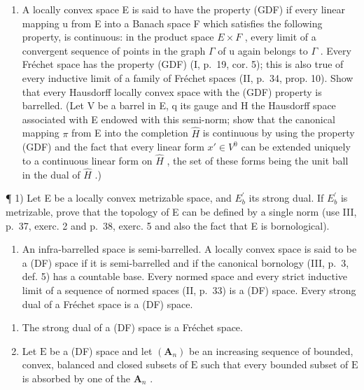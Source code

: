 \begin{enumerate}
\def\labelenumi{\arabic{enumi})}
\setcounter{enumi}{25}
\tightlist
\item
  A locally convex space E is said to have the property (GDF) if every linear mapping u from E into a Banach space F which satisfies the following property, is continuous: in the product space \(E \times F\) , every limit of a convergent sequence of points in the graph \(\Gamma\) of u again belongs to \(\Gamma\) . Every Fréchet space has the property (GDF) (I, p.~19, cor. 5); this is also true of every inductive limit of a family of Fréchet spaces (II, p.~34, prop. 10). Show that every Hausdorff locally convex space with the (GDF) property is barrelled. (Let V be a barrel in E, q its gauge and H the Hausdorff space associated with E endowed with this semi-norm; show that the canonical mapping \(\pi\) from E into the completion \(\hat{H}\) is continuous by using the property (GDF) and the fact that every linear form \(x' \in V^{0}\) can be extended uniquely to a continuous linear form on \(\hat{H}\) , the set of these forms being the unit ball in the dual of \(\hat{H}\) .)
\end{enumerate}

\exercisegroup

¶ 1) Let E be a locally convex metrizable space, and \(E_{b}^{\prime}\) its strong dual. If \(E_{b}^{\prime}\) is metrizable, prove that the topology of E can be defined by a single norm (use III, p.~37, exerc. 2 and p.~38, exerc. 5 and also the fact that E is bornological).

\begin{enumerate}
\def\labelenumi{\arabic{enumi})}
\setcounter{enumi}{1}
\tightlist
\item
  An infra-barrelled space is semi-barrelled. A locally convex space is said to be a (DF) space if it is semi-barrelled and if the canonical bornology (III, p.~3, def. 5) has a countable base. Every normed space and every strict inductive limit of a sequence of normed spaces (II, p.~33) is a (DF) space. Every strong dual of a Fréchet space is a (DF) space.
\end{enumerate}

\begin{enumerate}
\def\labelenumi{\alph{enumi})}
\item
  The strong dual of a (DF) space is a Fréchet space.
\item
  Let \(\mathrm{E}\) be a (DF) space and let \((\mathbf{A}_n)\) be an increasing sequence of bounded, convex, balanced and closed subsets of \(\mathrm{E}\) such that every bounded subset of \(\mathrm{E}\) is absorbed by one of the \(\mathbf{A}_n\) .
\end{enumerate}

